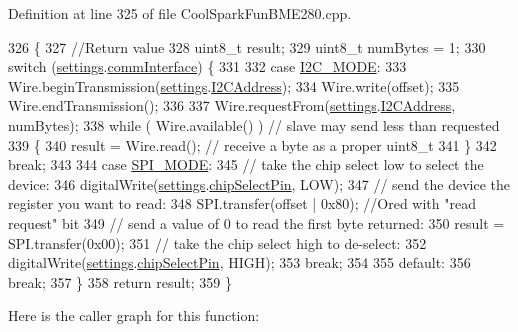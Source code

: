 Definition at line 325 of file Cool\+Spark\+Fun\+B\+M\+E280.\+cpp.


\begin{DoxyCode}
326 \{
327     \textcolor{comment}{//Return value}
328     uint8\_t result;
329     uint8\_t numBytes = 1;
330     \textcolor{keywordflow}{switch} (\hyperlink{class_b_m_e280_af06253eb2f8ad4b5fabb858bc4a973bf}{settings}.\hyperlink{struct_sensor_settings_a5bf116387c543a6ea5732976424e8cb1}{commInterface}) \{
331 
332     \textcolor{keywordflow}{case} \hyperlink{_cool_spark_fun_b_m_e280_8h_a5cd01756030509b764d43a2b8c94fce8}{I2C\_MODE}:
333         Wire.beginTransmission(\hyperlink{class_b_m_e280_af06253eb2f8ad4b5fabb858bc4a973bf}{settings}.\hyperlink{struct_sensor_settings_af8103021dbce7e5ee6d786c4893324f7}{I2CAddress});
334         Wire.write(offset);
335         Wire.endTransmission();
336 
337         Wire.requestFrom(\hyperlink{class_b_m_e280_af06253eb2f8ad4b5fabb858bc4a973bf}{settings}.\hyperlink{struct_sensor_settings_af8103021dbce7e5ee6d786c4893324f7}{I2CAddress}, numBytes);
338         \textcolor{keywordflow}{while} ( Wire.available() ) \textcolor{comment}{// slave may send less than requested}
339         \{
340             result = Wire.read(); \textcolor{comment}{// receive a byte as a proper uint8\_t}
341         \}
342         \textcolor{keywordflow}{break};
343 
344     \textcolor{keywordflow}{case} \hyperlink{_cool_spark_fun_b_m_e280_8h_ab1dcc9464e3fcb94922386e8a7f53f21}{SPI\_MODE}:
345         \textcolor{comment}{// take the chip select low to select the device:}
346         digitalWrite(\hyperlink{class_b_m_e280_af06253eb2f8ad4b5fabb858bc4a973bf}{settings}.\hyperlink{struct_sensor_settings_abe2de606ebb580ad81e3fafb1a454580}{chipSelectPin}, LOW);
347         \textcolor{comment}{// send the device the register you want to read:}
348         SPI.transfer(offset | 0x80);  \textcolor{comment}{//Ored with "read request" bit}
349         \textcolor{comment}{// send a value of 0 to read the first byte returned:}
350         result = SPI.transfer(0x00);
351         \textcolor{comment}{// take the chip select high to de-select:}
352         digitalWrite(\hyperlink{class_b_m_e280_af06253eb2f8ad4b5fabb858bc4a973bf}{settings}.\hyperlink{struct_sensor_settings_abe2de606ebb580ad81e3fafb1a454580}{chipSelectPin}, HIGH);
353         \textcolor{keywordflow}{break};
354 
355     \textcolor{keywordflow}{default}:
356         \textcolor{keywordflow}{break};
357     \}
358     \textcolor{keywordflow}{return} result;
359 \}
\end{DoxyCode}
Here is the caller graph for this function\+:\nopagebreak

